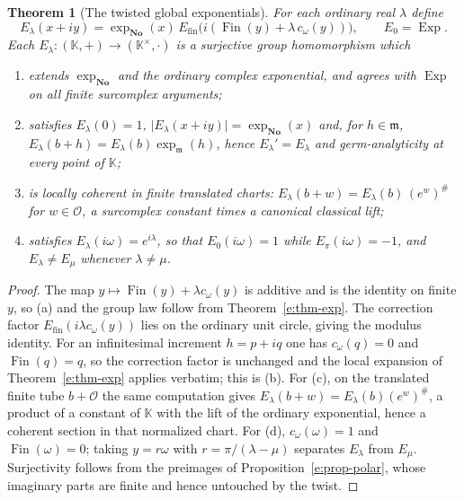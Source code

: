 \documentclass[11pt,a4paper]{article}
\numberwithin{equation}{section}
\newtheorem{theorem}{Theorem}[section]
\theoremstyle{definition}
\theoremstyle{remark}
\theoremstyle{plain}
\newcommand{\K}{\mathbb K}
\newcommand{\No}{\mathbf{No}}
\newcommand{\Ov}{\mathcal O}
\newcommand{\mm}{\mathfrak m}
\DeclareMathOperator{\Exp}{Exp}
\newcommand{\ev}[1]{#1^{\#}}
\newcommand{\abs}[1]{\lvert #1\rvert}
\begin{document}
\begin{theorem}[The twisted global exponentials]\label{e:thm-twisted}
For each ordinary real $\lambda$ define
\begin{equation}\label{e:eq-twisted}
 E_\lambda(x+iy)=\exp_{\No}(x)\,
 E_{\mathrm{fin}}\bigl(i(\operatorname{Fin}(y)+\lambda\,c_\omega(y))\bigr),
 \qquad E_0=\Exp .
\end{equation}
Each $E_\lambda:(\K,+)\to(\K^{\times},\cdot)$ is a surjective group
homomorphism which
\begin{enumerate}[label=\textup{(\alph*)}]
\item extends $\exp_{\No}$ and the ordinary complex exponential, and
      agrees with $\Exp$ on \emph{all finite} surcomplex arguments;
\item satisfies $E_\lambda(0)=1$, $\abs{E_\lambda(x+iy)}=\exp_{\No}(x)$
      and, for $h\in\mm$,
      $E_\lambda(b+h)=E_\lambda(b)\exp_{\mm}(h)$, hence
      $E_\lambda'=E_\lambda$ and germ-analyticity at every point of $\K$;
\item is locally coherent in finite translated charts:
      $E_\lambda(b+w)=E_\lambda(b)\,\ev{(e^{w})}$ for $w\in\Ov$, a
      surcomplex constant times a canonical classical lift;
\item satisfies $E_\lambda(i\omega)=e^{i\lambda}$, so that
      $E_0(i\omega)=1$ while $E_\pi(i\omega)=-1$, and $E_\lambda\ne E_\mu$
      whenever $\lambda\ne\mu$.
\end{enumerate}
\end{theorem}

\begin{proof}
The map $y\mapsto\operatorname{Fin}(y)+\lambda c_\omega(y)$ is additive and
is the identity on finite $y$, so (a) and the group law follow from
Theorem~\ref{e:thm-exp}.  The correction factor
$E_{\mathrm{fin}}(i\lambda c_\omega(y))$ lies on the ordinary unit circle,
giving the modulus identity.  For an infinitesimal increment $h=p+iq$ one
has $c_\omega(q)=0$ and $\operatorname{Fin}(q)=q$, so the correction factor
is unchanged and the local expansion of Theorem~\ref{e:thm-exp} applies
verbatim; this is (b).  For (c), on the translated finite tube $b+\Ov$ the
same computation gives $E_\lambda(b+w)=E_\lambda(b)\ev{(e^w)}$, a product
of a constant of $\K$ with the lift of the ordinary exponential, hence a
coherent section in that normalized chart.  For (d), $c_\omega(\omega)=1$
and $\operatorname{Fin}(\omega)=0$; taking $y=r\omega$ with
$r=\pi/(\lambda-\mu)$ separates $E_\lambda$ from $E_\mu$.  Surjectivity
follows from the preimages of
Proposition~\ref{e:prop-polar}, whose imaginary parts are finite and hence
untouched by the twist.
\end{proof}
\end{document}
